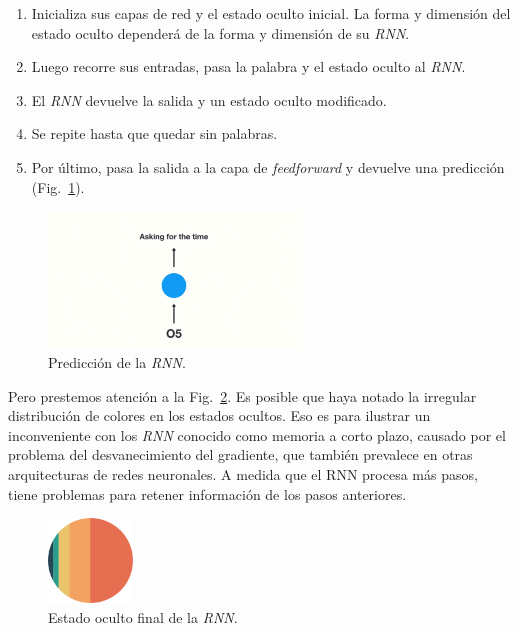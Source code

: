 \documentclass[a4paper,12pt]{article}
\begin{document}
\begin{enumerate}[noitemsep, topsep=2pt]
	\item Inicializa sus capas de red y el estado oculto inicial. La forma y dimensión del estado oculto dependerá de la forma y dimensión de su \textit{RNN}.
	\item Luego recorre sus entradas, pasa la palabra y el estado oculto al \textit{RNN}.
	\item El \textit{RNN} devuelve la salida y un estado oculto modificado.
	\item Se repite hasta que quedar sin palabras.
	\item Por último, pasa la salida a la capa de \textit{feedforward} y devuelve una predicción (Fig.~\ref{fig:rnnvanishing2}).
\end{enumerate}

\begin{figure}[H]
	\begin{center}				
		\includegraphics[width=0.6\textwidth]{vanishing2.png}
		\caption{Predicción de la \textit{RNN}.\citep{phi:rnn}}
		\label{fig:rnnvanishing2}
	\end{center}
\end{figure}

Pero prestemos atención a la Fig.~\ref{fig:rnnvanishing3}. Es posible que haya notado la irregular distribución de colores en los estados ocultos. Eso es para ilustrar un inconveniente con los \textit{RNN} conocido como memoria a corto plazo, causado por el problema del desvanecimiento del gradiente, que también prevalece en otras arquitecturas de redes neuronales. A medida que el RNN procesa más pasos, tiene problemas para retener información de los pasos anteriores.

\begin{figure}[H]
	\begin{center}				
		\includegraphics[width=0.2\textwidth]{vanishin3.png}
		\caption{Estado oculto final de la \textit{RNN}.\citep{phi:rnn}}
		\label{fig:rnnvanishing3}
	\end{center}
\end{figure}
\end{document}
